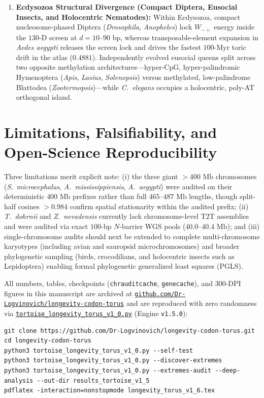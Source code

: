 \documentclass[11pt,a4paper]{article}
\renewcommand{\_}{\origunderscore\penalty200\relax}
\theoremstyle{remark}
\begin{document}
\begin{enumerate}
  \item \textbf{Ecdysozoa Structural Divergence (Compact Diptera, Eusocial Insects, and Holocentric Nematodes):} Within Ecdysozoa, compact nucleosome-phased Diptera (\textit{Drosophila}, \textit{Anopheles}) lock $W_{-+}$ energy inside the $130\text{-D}$ screen at $d=10\text{--}90\text{ bp}$, whereas transposable-element expansion in \textit{Aedes aegypti} releases the screen lock and drives the fastest $100\text{-Myr}$ toric drift in the atlas ($0.4881$). Independently evolved eusocial queens split across two opposite methylation architectures---hyper-CpG, hyper-palindromic Hymenoptera (\textit{Apis}, \textit{Lasius}, \textit{Solenopsis}) versus methylated, low-palindrome Blattodea (\textit{Zootermopsis})---while \textit{C.\ elegans} occupies a holocentric, poly-AT orthogonal island.
\end{enumerate}

\section{Limitations, Falsifiability, and Open-Science Reproducibility}
Three limitations merit explicit note: (i) the three giant $>400\text{ Mb}$ chromosomes (\textit{S.\ microcephalus}, \textit{A.\ mississippiensis}, \textit{A.\ aegypti}) were audited on their deterministic $400\text{ Mb}$ prefixes rather than full $465\text{--}487\text{ Mb}$ lengths, though split-half cosines $>0.984$ confirm spatial stationarity within the audited prefix; (ii) \textit{T.\ dohrnii} and \textit{Z.\ nevadensis} currently lack chromosome-level T2T assemblies and were audited via exact $100\text{-bp}$ $N$-barrier WGS pools ($40.0\text{--}40.4\text{ Mb}$); and (iii) single-chromosome audits should next be extended to complete multi-chromosome karyotypes (including avian and sauropsid microchromosomes) and broader phylogenetic sampling (birds, crocodilians, and holocentric insects such as Lepidoptera) enabling formal phylogenetic generalized least squares (PGLS).

All numbers, tables, checkpoints (\texttt{chr\_audit\_cache}, \texttt{gene\_cache}), and 300-DPI figures in this manuscript are archived at \href{https://github.com/Dr-Logvinovich/longevity-codon-torus}{\nolinkurl{github.com/Dr-Logvinovich/longevity-codon-torus}} and are reproduced with zero randomness via \href{https://github.com/Dr-Logvinovich/longevity-codon-torus/blob/main/tortoise_longevity_torus_v1_0.py}{\nolinkurl{tortoise_longevity_torus_v1_0.py}} (Engine \texttt{v1.5.0}):
{\small
\begin{verbatim}
git clone https://github.com/Dr-Logvinovich/longevity-codon-torus.git
cd longevity-codon-torus
python3 tortoise_longevity_torus_v1_0.py --self-test
python3 tortoise_longevity_torus_v1_0.py --discover-extremes
python3 tortoise_longevity_torus_v1_0.py --extremes-audit --deep-analysis --out-dir results_tortoise_v1_5
pdflatex -interaction=nonstopmode longevity_torus_v1_6.tex
\end{verbatim}
}
\end{document}
